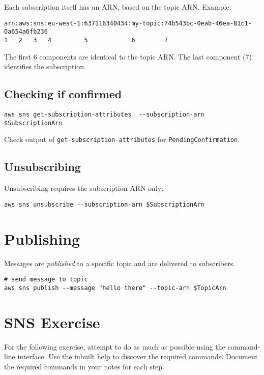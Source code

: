 Each subscription itself has an ARN, based on the topic ARN. Example:

\begin{verbatim}
arn:aws:sns:eu-west-1:637116340434:my-topic:74b543bc-0eab-46ea-81c1-0a654a6fb236
1   2   3   4         5            6        7
\end{verbatim}

The first 6 components are identical to the topic ARN. The last
component (7) identifies the subscription.

\subsection{Checking if confirmed}\label{checking-if-confirmed}

\begin{verbatim}
aws sns get-subscription-attributes  --subscription-arn $SubscriptionArn
\end{verbatim}

Check output of \texttt{get-subscription-attributes} for
\texttt{PendingConfirmation}.

\subsection{Unsubscribing}\label{unsubscribing}

Unsubscribing requires the subscription ARN only:

\begin{verbatim}
aws sns unsubscribe --subscription-arn $SubscriptionArn
\end{verbatim}

\section{Publishing}\label{publishing}

Messages are \emph{published} to a specific topic and are delivered to
subscribers.

\begin{verbatim}
# send message to topic 
aws sns publish --message "hello there" --topic-arn $TopicArn
\end{verbatim}


\section{SNS Exercise}
\label{sec:sns-exercise}

For the following exercise, attempt to do as much as possible using the command-line interface.
Use the inbuilt help to discover the required commands.
Document the required commands in your notes for each step.

